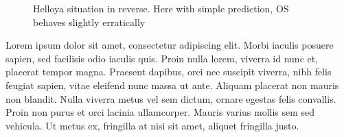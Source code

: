 \begin{figure}[ht]
\begin{subfigure}[b]{0.499\textwidth}
    \end{subfigure}
    \hfill
    \caption{Helloya situation in reverse. Here with simple prediction, \gls{OS} behaves slightly erratically}
\end{figure}

Lorem ipsum dolor sit amet, consectetur adipiscing elit. Morbi iaculis posuere sapien, sed facilisis odio iaculis quis. 
Proin nulla lorem, viverra id nunc et, placerat tempor magna. Praesent dapibus, orci nec suscipit viverra, nibh felis feugiat sapien, 
vitae eleifend nunc massa ut ante. Aliquam placerat non mauris non blandit. Nulla viverra metus vel sem dictum, ornare egestas felis convallis. 
Proin non purus et orci lacinia ullamcorper. Mauris varius mollis sem sed vehicula. Ut metus ex, fringilla at nisi sit amet, aliquet fringilla justo.

